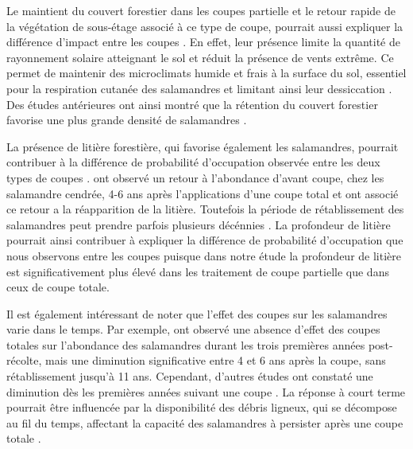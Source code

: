 Le maintient du couvert forestier dans les coupes partielle et le retour rapide de la végétation de sous-étage associé à ce type de coupe, pourrait aussi expliquer la différence d'impact entre les coupes \citep{Raybuck2015silviculturalpractices}.
En effet, leur présence limite la quantité de rayonnement solaire atteignant le sol et réduit la présence de vents extrême. 
Ce permet de maintenir des microclimats humide et frais à la surface du sol, essentiel pour la respiration cutanée des salamandres et limitant ainsi leur dessiccation \citep{Homyack2011Energeticssurfaceactive}. 
Des études antérieures ont ainsi montré que la rétention du couvert forestier favorise une plus grande densité de salamandres \citep{Hocking2013Effectsexperimental,Harper2015Impactforestry,Mahoney2016Woodlandsalamander}. 

La présence de litière forestière, qui favorise également les salamandres, pourrait contribuer à la différence de probabilité d'occupation observée entre les deux types de coupes \citep{Tilghman2012Metaanalysiseffects}.
\cite{Ash1997DisappearanceReturn} ont observé un retour à l'abondance d'avant coupe, chez les salamandre cendrée, 4-6 ans après l'applications d'une coupe total et ont associé ce retour a la réapparition de la litière. 
Toutefois la période de rétablissement des salamandres peut prendre parfois plusieurs décénnies \citep{Homyack2013Effectsrepeatedstand,Ochs2022Responseterrestrial}. 
La profondeur de litière pourrait ainsi contribuer à expliquer la différence de probabilité d'occupation que nous observons entre les coupes puisque dans notre étude la profondeur de litière est significativement plus élevé dans les traitement de coupe partielle que dans ceux de coupe totale.

Il est également intéressant de noter que l'effet des coupes sur les salamandres varie dans le temps. 
Par exemple, \cite{Ochs2022Responseterrestrial} ont observé une absence d'effet des coupes totales sur l'abondance des salamandres durant les trois premières années post-récolte, 
mais une diminution significative entre 4 et 6 ans après la coupe, sans rétablissement jusqu'à 11 ans. 
Cependant, d'autres études ont constaté une diminution dès les premières années suivant une coupe \citep{deMaynadier1995relationshipforest,Macneil2014Effectstimber}. 
La réponse à court terme pourrait être influencée par la disponibilité des débris ligneux, qui se décompose au fil du temps, affectant la capacité des salamandres à persister après une coupe totale \citep{Ochs2022Responseterrestrial}. 


